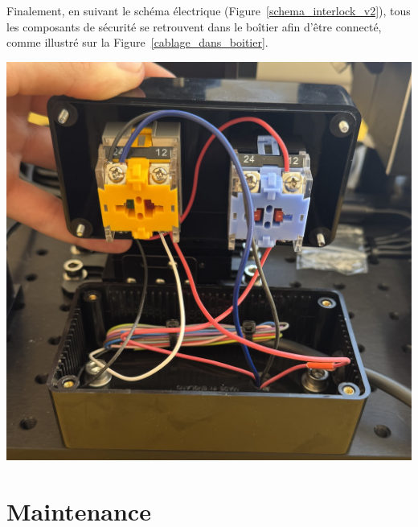 \begin{minipage}[c]{0.48\textwidth}
    Finalement, en suivant le schéma électrique (Figure~\ref{schema_interlock_v2}), tous les composants de sécurité se retrouvent dans le boîtier afin d'être connecté, comme illustré sur la Figure~\ref{cablage_dans_boitier}.
\end{minipage}\hfill
\begin{minipage}[c]{0.48\textwidth}
    \begin{center}
        \includegraphics[width=\textwidth]{assets/figures/Protections_laser/Securite_electrique/cablage_dans_boitier.jpeg}
    \end{center}
    \label{cablage_dans_boitier}
\end{minipage}

\section{Maintenance} \label{section:maintenance}


